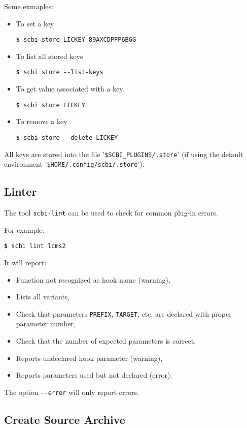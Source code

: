 \documentclass[a4paper,12pt,twoside]{article}
\newcommand{\code}[1]{\texttt{#1}}
\newcommand{\file}[1]{'{\texttt{#1}}'}
\newcommand{\cmd}[1]{\tabto{1cm}\hspace{0.5cm}\texttt{\textbf{\$} #1}}
\newcommand{\ddash}{-{}-}
\begin{document}
Some exmaples:

\begin{itemize}
	\item To set a key

	\cmd{scbi store LICKEY 89AXCDPPP6BGG}

	\item To list all stored keys

	\cmd{scbi store \ddash{}list-keys}

	\item To get value associated with a key

	\cmd{scbi store LICKEY}

	\item To remove a key

    \cmd{scbi store \ddash{}delete LICKEY}
\end{itemize}

All keys are stored into the file \file{\$SCBI\_PLUGINS/.store} (if using the default environment \file{\$HOME/.config/scbi/.store}).

\subsection{Linter}
\label{linter}

The tool \code{scbi-lint} can be used to check for common plug-in errors.

For example:

\cmd{scbi lint lcms2}

It will report:

\begin{itemize}
	\item Function not recognized as hook name (warning),
	\item Lists all variants,
	\item Check that parameters \code{PREFIX}, \code{TARGET}, etc. are declared with proper parameter number,
	\item Check that the number of expected parameters is correct,
	\item Reports undeclared hook parameter (warning),
	\item Reports parameters used but not declared (error).
\end{itemize}

The option \code{\ddash{}error} will only report errors.

\subsection{Create Source Archive}
\label{createsourcearchive}
\end{document}
